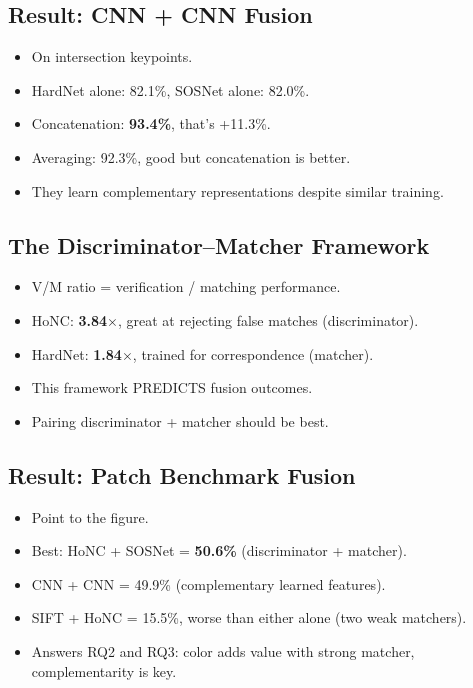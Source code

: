 \documentclass[11pt, letterpaper]{article}
\begin{document}
\subsection{Result: CNN + CNN Fusion}
\begin{itemize}
  \item On intersection keypoints.
  \item HardNet alone: 82.1\%, SOSNet alone: 82.0\%.
  \item Concatenation: \textbf{93.4\%}, that's +11.3\%.
  \item Averaging: 92.3\%, good but concatenation is better.
  \item They learn complementary representations despite similar training.
\end{itemize}

\subsection{The Discriminator--Matcher Framework}
\begin{itemize}
  \item V/M ratio = verification / matching performance.
  \item HoNC: \textbf{3.84$\times$}, great at rejecting false matches (discriminator).
  \item HardNet: \textbf{1.84$\times$}, trained for correspondence (matcher).
  \item This framework PREDICTS fusion outcomes.
  \item Pairing discriminator + matcher should be best.
\end{itemize}

\subsection{Result: Patch Benchmark Fusion}
\begin{itemize}
  \item Point to the figure.
  \item Best: HoNC + SOSNet = \textbf{50.6\%} (discriminator + matcher).
  \item CNN + CNN = 49.9\% (complementary learned features).
  \item SIFT + HoNC = 15.5\%, worse than either alone (two weak matchers).
  \item Answers RQ2 and RQ3: color adds value with strong matcher, complementarity is key.
\end{itemize}
\end{document}
